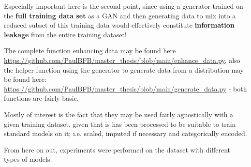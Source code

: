 Especially important here is the second point, since using a generator trained on the \textbf{full training data set} as a \ac{GAN} and then generating data to mix into a reduced subset of this training data
would effectively constitute \textbf{information leakage} from the entire training dataset!

\pagebreak

The complete function enhancing data may be found here \url{https://github.com/PaulBFB/master_thesis/blob/main/enhance_data.py}, also the helper function using the generator to generate data from a distribution may be found here: \url{https://github.com/PaulBFB/master_thesis/blob/main/generate_data.py} - both functions are fairly basic. 

Mostly of interest is the fact that they may be used fairly agnostically with a given training dataset, given that is has been processed to be suitable to train standard models on it; i.e. scaled, imputed if necessary and categorically encoded.

From here on out, experiments were performed on the dataset with different types of models.

